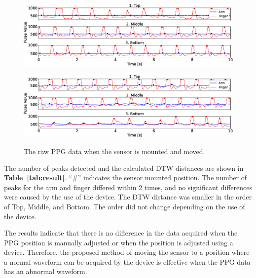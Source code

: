\documentclass[sigconf]{acmart}
\newcommand\tabref[1]{\textbf{Table~\ref{tab:#1}}}
\begin{document}
\begin{figure}[!t]
    \centering
    \begin{minipage}[t]{1\linewidth}
        \centering
        \includegraphics[width=1\linewidth]{figures/manual.eps}
        \label{fig:manual}
    \end{minipage}
    \begin{minipage}[t]{1\linewidth}
        \centering
        \includegraphics[width=1\linewidth]{figures/auto.eps}
        \label{fig:auto}
    \end{minipage}
    \caption{The raw PPG data when the sensor is mounted and moved.}
\end{figure}

The number of peaks detected and the calculated DTW distances are shown in \tabref{result}. ``\#'' indicates the sensor mounted position. The number of peaks for the arm and finger differed within 2 times, and no significant differences were caused by the use of the device. The DTW distance was smaller in the order of Top, Middle, and Bottom. The order did not change depending on the use of the device.\par

The results indicate that there is no difference in the data acquired when the PPG position is manually adjusted or when the position is adjusted using a device. Therefore, the proposed method of moving the sensor to a position where a normal waveform can be acquired by the device is effective when the PPG data has an abnormal waveform.
\end{document}
